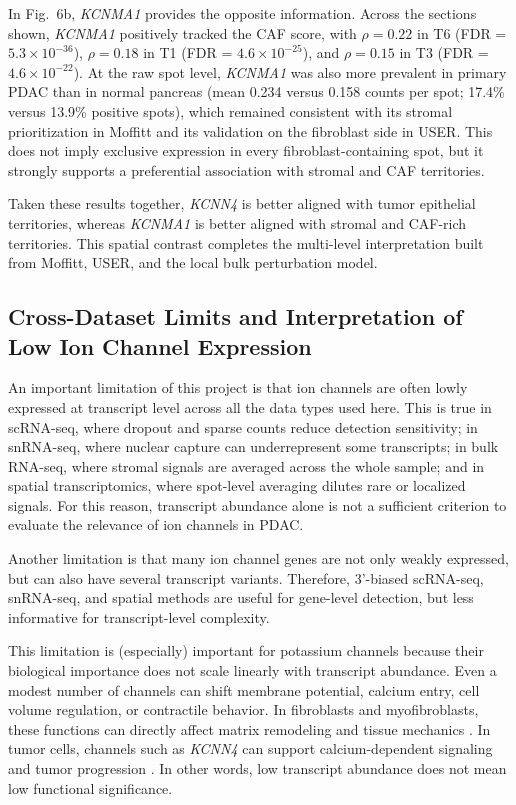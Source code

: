 \documentclass[11pt,a4paper]{article}
\begin{document}
In Fig.~6b, \textit{KCNMA1} provides the opposite information. Across the sections shown, \textit{KCNMA1} positively tracked the CAF score, with $\rho = 0.22$ in T6 (FDR = $5.3\times 10^{-36}$), $\rho = 0.18$ in T1 (FDR = $4.6\times 10^{-25}$), and $\rho = 0.15$ in T3 (FDR = $4.6\times 10^{-22}$). At the raw spot level, \textit{KCNMA1} was also more prevalent in primary PDAC than in normal pancreas (mean 0.234 versus 0.158 counts per spot; 17.4\% versus 13.9\% positive spots), which remained consistent with its stromal prioritization in Moffitt and its validation on the fibroblast side in USER. This does not imply exclusive expression in every fibroblast-containing spot, but it strongly supports a preferential association with stromal and CAF territories.

Taken these results together, \textit{KCNN4} is better aligned with tumor epithelial territories, whereas \textit{KCNMA1} is better aligned with stromal and CAF-rich territories. This spatial contrast completes the multi-level interpretation built from Moffitt, USER, and the local bulk perturbation model.

\subsection{Cross-Dataset Limits and Interpretation of Low Ion Channel Expression}
An important limitation of this project is that ion channels are often lowly expressed at transcript level across all the data types used here. This is true in scRNA-seq, where dropout and sparse counts reduce detection sensitivity; in snRNA-seq, where nuclear capture can underrepresent some transcripts; in bulk RNA-seq, where stromal signals are averaged across the whole sample; and in spatial transcriptomics, where spot-level averaging dilutes rare or localized signals. For this reason, transcript abundance alone is not a sufficient criterion to evaluate the relevance of ion channels in PDAC.

Another limitation is that many ion channel genes are not only weakly expressed, but can also have several transcript variants. Therefore, 3'-biased scRNA-seq, snRNA-seq, and spatial methods are useful for gene-level detection, but less informative for transcript-level complexity.

This limitation is (especially) important for potassium channels because their biological importance does not scale linearly with transcript abundance. Even a modest number of channels can shift membrane potential, calcium entry, cell volume regulation, or contractile behavior. In fibroblasts and myofibroblasts, these functions can directly affect matrix remodeling and tissue mechanics \citep{scruggs2020}. In tumor cells, channels such as \textit{KCNN4} can support calcium-dependent signaling and tumor progression \citep{jiang2019}. In other words, low transcript abundance does not mean low functional significance.
\end{document}
